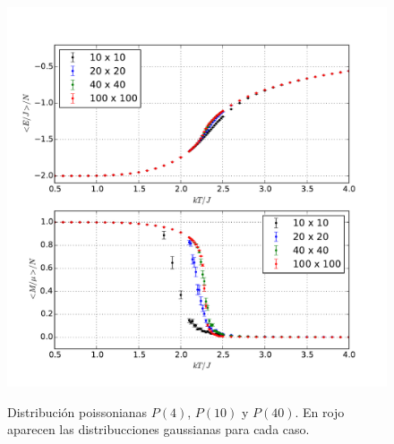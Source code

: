 \documentclass[a4paper,12pt]{article}
\begin{document}
\begin{figure}[H]
    \begin{center}
      \includegraphics[scale=0.6]{tamano_val_medios.pdf} \\
      \caption{Distribución poissonianas $P(4)$, $P(10)$ y $P(40)$. En rojo 
      aparecen las distribucciones gaussianas para cada 
      caso.}\label{fig:tam_val_medios}
    \end{center}
\end{figure}
\end{document}
